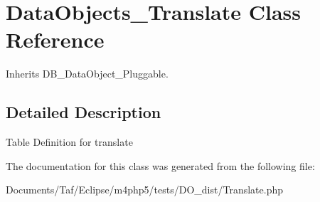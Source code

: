 \hypertarget{classDataObjects__Translate}{
\section{DataObjects\_\-Translate Class Reference}
\label{classDataObjects__Translate}
}
Inherits DB\_\-DataObject\_\-Pluggable.



\subsection{Detailed Description}
Table Definition for translate 

The documentation for this class was generated from the following file:\begin{CompactItemize}
\item 
Documents/Taf/Eclipse/m4php5/tests/DO\_\-dist/Translate.php\end{CompactItemize}
